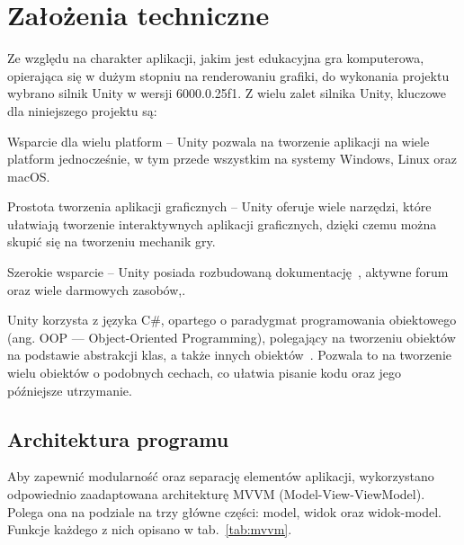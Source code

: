 \section{Założenia techniczne}
\label{sec:zalozenia_techniczne}

Ze względu na charakter aplikacji, jakim jest edukacyjna gra komputerowa,
opierająca się w dużym stopniu na renderowaniu grafiki,
do wykonania projektu wybrano silnik Unity w wersji 6000.0.25f1.
Z wielu zalet silnika Unity, kluczowe dla niniejszego projektu są:

\begin{citemize}
    \item Wsparcie dla wielu platform --
    Unity pozwala na tworzenie aplikacji na wiele platform jednocześnie, w tym przede wszystkim na systemy Windows, Linux oraz macOS.
    \item Prostota tworzenia aplikacji graficznych --
    Unity oferuje wiele narzędzi, które ułatwiają tworzenie interaktywnych aplikacji graficznych,
    dzięki czemu można skupić się na tworzeniu mechanik gry.
    \item Szerokie wsparcie --
    Unity posiada rozbudowaną dokumentację~\cite{unity_docs},
    aktywne forum~\cite{unity_forum} oraz wiele darmowych zasobów,.
\end{citemize}

Unity korzysta z języka C\#, opartego o paradygmat programowania obiektowego (ang. OOP — Object-Oriented Programming),
polegający na tworzeniu obiektów na podstawie abstrakcji klas, a także innych obiektów~\cite{nygaard1986basic}.
Pozwala to na tworzenie wielu obiektów o podobnych cechach, co ułatwia pisanie kodu oraz jego późniejsze utrzymanie.\\

\subsection{Architektura programu}
\label{subsec:architektura_programu}

Aby zapewnić modularność oraz separację elementów aplikacji,
wykorzystano odpowiednio zaadaptowana architekturę MVVM (Model-View-ViewModel).
Polega ona na podziale na trzy główne części: model, widok oraz widok-model.
Funkcje każdego z nich opisano w tab.~\ref{tab:mvvm}.

